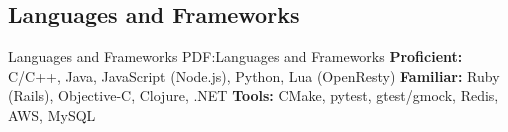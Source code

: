 \documentclass[a4paper,10pt,oneside]{article}
\begin{document}
\begin{body}
\section
{Languages and Frameworks}
{Languages and Frameworks}
{PDF:Languages and Frameworks}
\textbf{Proficient: } C/C++, Java, JavaScript (Node.js), Python, Lua (OpenResty)
\SmallEntryGap
\textbf{Familiar: } Ruby (Rails), Objective-C, Clojure, .NET
\SmallEntryGap
\textbf{Tools: } CMake, pytest, gtest/gmock, Redis, AWS, MySQL
\EntryGap

%



\end{body}



\end{document}
